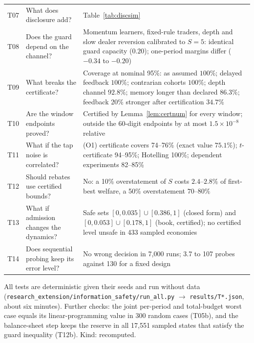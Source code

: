 \documentclass[12pt]{article}
\theoremstyle{definition}
\theoremstyle{remark}
\begin{document}
\begin{table}[!tbp]
\begin{threeparttable}
\begin{tabular}{p{}p{}p{}}
T07 & What does disclosure add? & Table~\ref{tab:discsim}\\
T08 & Does the guard depend on the channel? & Momentum learners, fixed-rule traders, depth and slow dealer reversion calibrated to $S=5$: identical guard capacity ($0.20$); one-period margins differ ($-0.34$ to $-0.20$)\\
T09 & What breaks the certificate? & Coverage at nominal 95\%: as assumed $100\%$; delayed feedback $100\%$; contrarian cohorts $100\%$; depth channel $92.8\%$; memory longer than declared $86.3\%$; feedback 20\% stronger after certification $34.7\%$\\
T10 & Are the window endpoints proved? & Certified by Lemma~\ref{lem:certnum} for every window; outside the 60-digit endpoints by at most $1.5\times10^{-8}$ relative\\
T11 & What if the tap noise is correlated? & (O1) certificate covers 74--76\% (exact value $75.1\%$); $t$-certificate 94--95\%; Hotelling 100\%; dependent experiments 82--85\%\\
T12 & Should rebates use certified bounds? & No: a 10\% overstatement of $S$ costs $2.4$--$2.8\%$ of first-best welfare, a 50\% overstatement $70$--$80\%$\\
T13 & What if admission changes the dynamics? & Safe sets $[0,0.035]\cup[0.386,1]$ (closed form) and $[0,0.053]\cup[0.178,1]$ (book, certified); no certified level unsafe in 433 sampled economies\\
T14 & Does sequential probing keep its error level? & No wrong decision in 7{,}000 runs; 3.7 to 107 probes against 130 for a fixed design\\
\bottomrule
\end{tabular}
\begin{tablenotes}\footnotesize\item All tests are deterministic given their seeds and run without data (\texttt{research\_extension/information\_safety/run\_all.py} $\to$ \texttt{results/T*.json}, about six minutes). Further checks: the joint per-period and total-budget worst case equals its linear-programming value in 300 random cases (T05b), and the balance-sheet step keeps the reserve in all 17{,}551 sampled states that satisfy the guard inequality (T12b). Kind: recomputed. \end{tablenotes}
\end{threeparttable}
\end{table}
\end{document}
